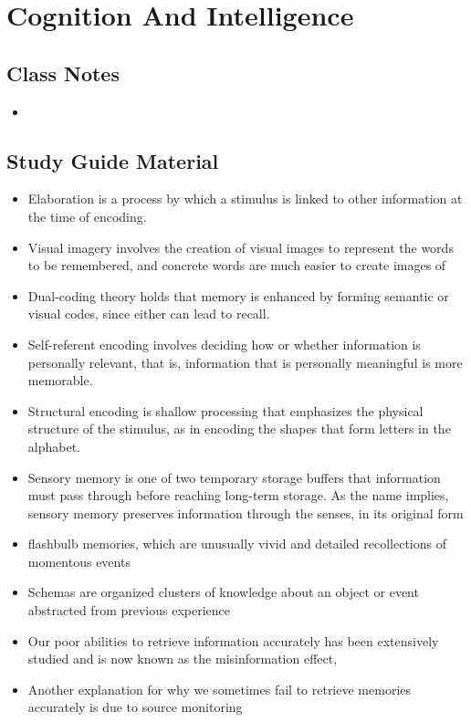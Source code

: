 \documentclass{article}
\begin{document}
\section{Cognition And Intelligence}

\subsection{Class Notes}
\begin{itemize}
    \item
\end{itemize}

\subsection{Study Guide Material}
\begin{itemize}
    \item Elaboration is a process by which a stimulus is linked to other information at the time of encoding.
    \item Visual imagery involves the creation of visual images to represent the words to be remembered, and concrete words are much easier to create images of
    \item Dual-coding theory holds that memory is enhanced by forming semantic or visual codes, since either can lead to recall.
    \item Self-referent encoding involves deciding how or whether information is personally relevant, that is, information that is personally meaningful is more memorable.
    \item Structural encoding is shallow processing that emphasizes the physical structure of the stimulus, as in encoding the shapes that form letters in the alphabet.
    \item Sensory memory is one of two temporary storage buffers that information must pass through before reaching long-term storage. As the name implies, sensory memory preserves information through the senses, in its original form
    \item flashbulb memories, which are unusually vivid and detailed recollections of momentous events
    \item Schemas are organized clusters of knowledge about an object or event abstracted from previous experience
    \item Our poor abilities to retrieve information accurately has been extensively studied and is now known as the misinformation effect,
    \item Another explanation for why we sometimes fail to retrieve memories accurately is due to source monitoring

\end{itemize}
\end{document}
